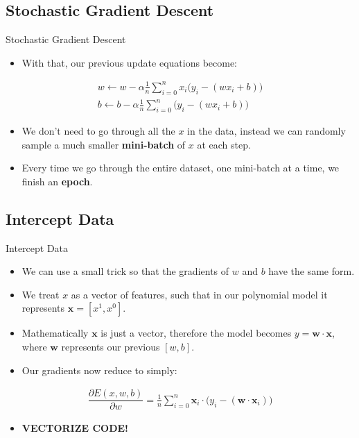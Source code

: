 \documentclass[xcolor=x11names,compress]{beamer}
\renewcommand{\(}{\begin{columns}}
\renewcommand{\)}{\end{columns}}
\newcommand{\<}[1]{\begin{column}{#1}}
\renewcommand{\>}{\end{column}}
\begin{document}
\subsection{Stochastic Gradient Descent}
\begin{frame}{Stochastic Gradient Descent}
	\begin{itemize}
		\item With that, our previous update equations become:
	\end{itemize}
	\begin{gather*}
	w \leftarrow w - \alpha \frac{1}{n}\sum_{i = 0}^n x_i \Big(y_i - (wx_i + b)\Big)\\
	b \leftarrow b - \alpha \frac{1}{n}\sum_{i = 0}^n \Big(y_i - (wx_i + b)\Big)
	\end{gather*}
	\begin{itemize}
		\item We don't need to go through all the $x$ in the data, instead we can randomly sample a much smaller \textbf{mini-batch} of $x$ at each step.
		\item Every time we go through the entire dataset, one mini-batch at a time, we finish an \textbf{epoch}.
	\end{itemize}
\end{frame}


\subsection{Intercept Data}
\begin{frame}{Intercept Data}
	\begin{itemize}
		\item We can use a small trick so that the gradients of $w$ and $b$ have the same form.
		\item We treat $x$ as a vector of features, such that in our polynomial model it represents $\boldsymbol{x} = [x^1, x^0]$.
		\item Mathematically $\boldsymbol{x}$ is just a vector, therefore the model becomes $y = \boldsymbol{w}\cdot\boldsymbol{x}$, where $\boldsymbol{w}$ represents our previous $[w, b]$.
		\item Our gradients now reduce to simply:
	\end{itemize}
	\begin{gather*}
	\dfrac{\partial E(x,w,b)}{\partial w} = \frac{1}{n}\sum_{i = 0}^n \boldsymbol{x}_i \cdot \Big(y_i - (\boldsymbol{w} \cdot \boldsymbol{x}_i)\Big)
	\end{gather*}
	\begin{itemize}
		\item \textbf{VECTORIZE CODE!}
	\end{itemize}
\end{frame}
\end{document}
